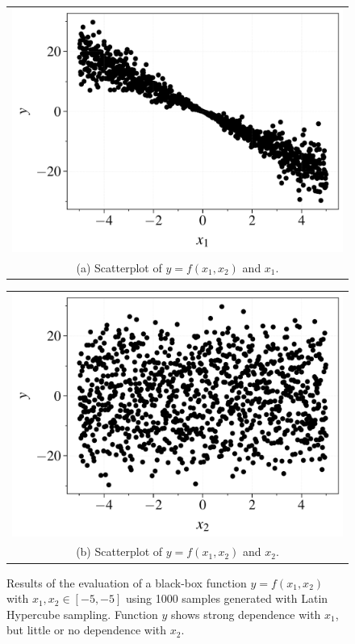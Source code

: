 \documentclass[twocolumn]{rps-esrel2022}
\begin{document}
\begin{figure}
	\centering
	\begin{tabular}{@{}c@{}}
	  \includegraphics[width=\linewidth]{figures/example_x1.pdf} \\[\abovecaptionskip]
	  \small (a) Scatterplot of $y=f(x_1,x_2)$ and $x_1$.
	\end{tabular}

	\vspace{\floatsep}

	\begin{tabular}{@{}c@{}}
	  \includegraphics[width=\linewidth]{figures/example_x2.pdf} \\[\abovecaptionskip]
	  \small (b) Scatterplot of $y=f(x_1,x_2)$ and $x_2$.
	\end{tabular}

	\caption{Results of the evaluation of a black-box function $y=f(x_1,x_2)$ with $x_1,x_2 \in [-5,-5]$ using 1000 samples generated with Latin Hypercube sampling.
	Function $y$ shows strong dependence with $x_1$, but little or no dependence with $x_2$.}\label{fig:myfig}
\end{figure}
\end{document}

